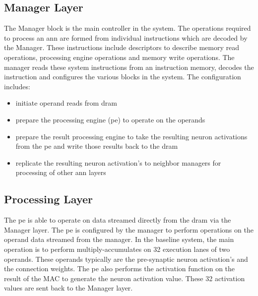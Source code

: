 \subsection{Manager Layer}
The Manager block is the main controller in the system. The operations required to process an \ac{ann} are formed from individual instructions which are decoded by the Manager. 
These instructions include descriptors to describe memory read operations, processing engine operations and memory write operations. The manager reads these system instructions from an instruction memory, decodes the instruction and configures the various blocks in the system.
The configuration includes:
\begin{itemize}

      \item initiate operand reads from \ac{dram}
      \item prepare the processing engine (\ac{pe}) to operate on the operands
      \item prepare the result processing engine to take the resulting neuron activations from the \ac{pe} and write those results back to the \ac{dram}
      \item replicate the resulting neuron activation's to neighbor managers for processing of other \ac{ann} layers

\end{itemize}

\subsection{Processing Layer}
\label{ssec:Processing Layer}
The \ac{pe} is able to operate on data streamed directly from the \ac{dram} via the Manager layer. The \ac{pe} is configured by the manager to perform operations on the operand data streamed from the manager. In the baseline system, the main operation is to perform multiply-accumulates on 32 execution lanes of two operands. These operands typically are the pre-synaptic neuron activation's and the connection weights. The \ac{pe} also performs the activation function on the result of the MAC to generate the neuron activation value. These 32 activation values are sent back to the Manager layer.

